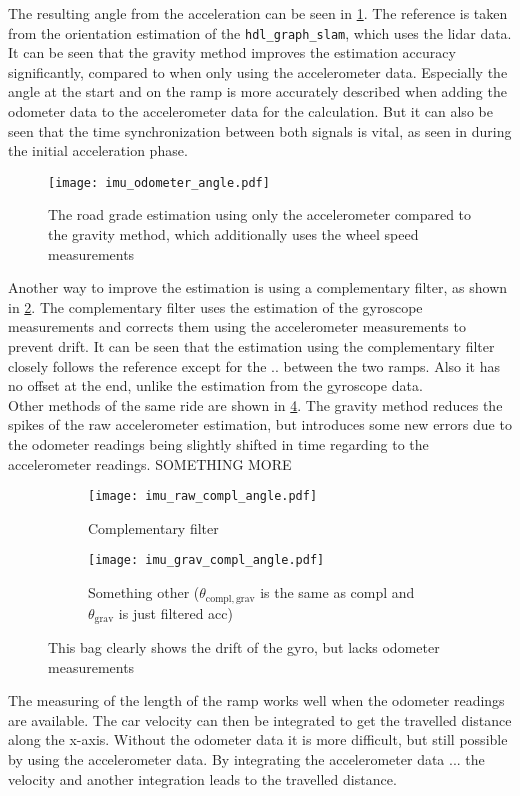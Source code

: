 The resulting angle from the acceleration can be seen in \cref{fig:imu_odometer_angle}.
The reference is taken from the orientation estimation of the \texttt{hdl\_graph\_slam}, which uses the \gls{lidar} data.
It can be seen that the gravity method improves the estimation accuracy significantly, compared to when only using the accelerometer data.
Especially the angle at the start and on the ramp is more accurately described when adding the odometer data to the accelerometer data for the calculation.
But it can also be seen that the time synchronization between both signals is vital, as seen in during the initial acceleration phase.
\begin{figure}[htbp]
	\centering
	\texttt{[image: imu\_odometer\_angle.pdf]}
	\caption[Gravity method]{The road grade estimation using only the accelerometer compared to the gravity method, which additionally uses the wheel speed measurements}
	\label{fig:imu_odometer_angle}
\end{figure}
Another way to improve the estimation is using a complementary filter, as shown in \cref{fig:imu_raw_compl_angle}.
The complementary filter uses the estimation of the gyroscope measurements and corrects them using the accelerometer measurements to prevent drift.
It can be seen that the estimation using the complementary filter closely follows the reference except for the .. between the two ramps.
Also it has no offset at the end, unlike the estimation from the gyroscope data.\\
Other methods of the same ride are shown in \cref{fig:imu_grav_compl_angle}.
The gravity method reduces the spikes of the raw accelerometer estimation, but introduces some new errors due to the odometer readings being slightly shifted in time regarding to the accelerometer readings.
SOMETHING MORE
\begin{figure}[htb]
	\centering
	\begin{subfigure}{1\textwidth}
		\centering
		\texttt{[image: imu\_raw\_compl\_angle.pdf]}
		\caption{Complementary filter}
		\label{fig:imu_raw_compl_angle}
	\end{subfigure}
	
	\begin{subfigure}{1\textwidth}
		\centering
		\texttt{[image: imu\_grav\_compl\_angle.pdf]}
		\caption{Something other ($\theta_\mathrm{compl, grav}$ is the same as compl and $\theta_\mathrm{grav}$ is just filtered acc)}
		\label{fig:imu_grav_compl_angle}
	\end{subfigure}
	\caption{This bag clearly shows the drift of the gyro, but lacks odometer measurements}
\end{figure}
The measuring of the length of the ramp works well when the odometer readings are available.
The car velocity can then be integrated to get the travelled distance along the x-axis.
Without the odometer data it is more difficult, but still possible by using the accelerometer data.
By integrating the accelerometer data ... the velocity and another integration leads to the travelled distance.


